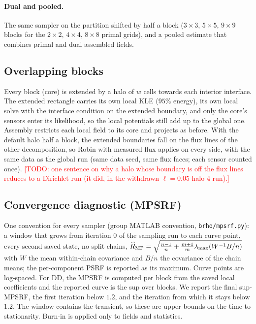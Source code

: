 \documentclass[11pt]{article}
\newcommand{\todo}[1]{\textcolor{red}{[TODO: #1]}}
\begin{document}
\paragraph{Dual and pooled.} The same sampler on the partition shifted by half a block ($3\times3$, $5\times5$, $9\times9$ blocks for the $2\times2$, $4\times4$, $8\times8$ primal grids), and a pooled estimate that combines primal and dual assembled fields.

\subsection{Overlapping blocks}\label{sec:overlap}
Every block (core) is extended by a halo of $w$ cells towards each interior interface. The extended rectangle carries its own local KLE ($95\%$ energy), its own local solve with the interface condition on the extended boundary, and only the core's sensors enter its likelihood, so the local potentials still add up to the global one. Assembly restricts each local field to its core and projects as before. With the default halo half a block, the extended boundaries fall on the flux lines of the other decomposition, so Robin with measured flux applies on every side, with the same data as the global run (same data seed, same flux faces; each sensor counted once). \todo{one sentence on why a halo whose boundary is off the flux lines reduces to a Dirichlet run (it did, in the withdrawn $\ell=0.05$ halo-4 run).}

\subsection{Convergence diagnostic (MPSRF)}\label{sec:mpsrf}
One convention for every sampler (group MATLAB convention, \texttt{brho/mpsrf.py}): a window that grows from iteration $0$ of the sampling run to each curve point, every second saved state, no split chains, $\widehat R_{\rm MP}=\sqrt{\tfrac{n-1}{n}+\tfrac{m+1}{m}\lambda_{\max}(W^{-1}B/n)}$ with $W$ the mean within-chain covariance and $B/n$ the covariance of the chain means; the per-component PSRF is reported as its maximum. Curve points are log-spaced. For DD, the MPSRF is computed per block from the saved local coefficients and the reported curve is the sup over blocks. We report the final sup-MPSRF, the first iteration below $1.2$, and the iteration from which it stays below $1.2$. The window contains the transient, so these are upper bounds on the time to stationarity. Burn-in is applied only to fields and statistics.
\end{document}
